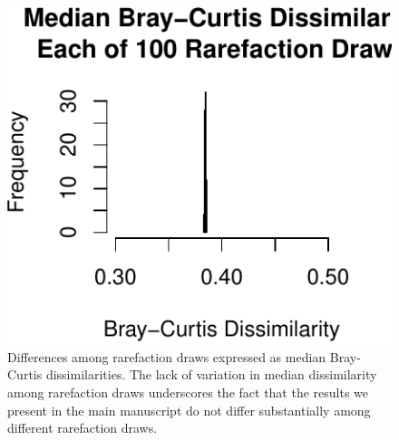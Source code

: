 \documentclass[fleqn,10pt,lineno]{wlpeerj} %
\begin{document}
\begin{figure}

{\centering \includegraphics{figures/Load_Supplement_Rarefaction_data-1} 

}

\caption{\label{fig:SuppFig1} Differences among rarefaction draws expressed as median Bray-Curtis dissimilarities. The lack of variation in median dissimilarity among rarefaction draws underscores the fact that the results we present in the main manuscript do not differ substantially among different rarefaction draws.}\label{fig:Load_Supplement_Rarefaction_data}
\end{figure}
\end{document}
